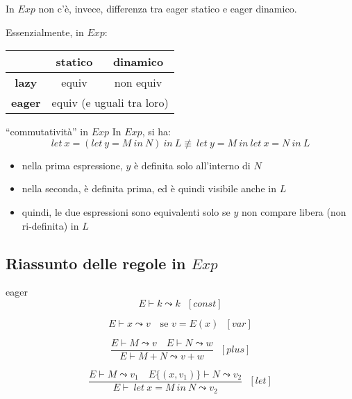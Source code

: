 \documentclass[a4paper,11pt]{report}
\begin{document}
In \( Exp \) non c'è, invece, differenza tra eager statico e eager dinamico.

\begin{gbox}{}
   Essenzialmente, in \( Exp \):
   \vspace{-1em}
\begin{center}
\begin{tabular}{c|c|c}
     & \textbf{statico} & \textbf{dinamico} \\ \hline
\textbf{lazy} & equiv & non equiv \\ \hline
\textbf{eager}& \multicolumn{2}{c}{equiv (e uguali tra loro)} \\
\end{tabular}
\end{center} 
\end{gbox}

\begin{gbox}[colframe=DeepGrey, colback=DeepGreyLight, colbacktitle=DeepGrey]{``commutatività'' in \( Exp \)}
    In \( Exp \), si ha:
    \[ let \ x = (let \ y  = M \ in \ N) \ in \ L \not\equiv \ let \ y = M \ in \ let \ x = N \ in \ L \]
\begin{itemize}
    \item nella prima espressione, \( y \) è definita solo all'interno di \( N \)
    \item nella seconda, è definita prima, ed è quindi visibile anche in \( L \)
    \item quindi, le due espressioni sono equivalenti solo se \( y \) non compare libera {\small \color{gray}(non ri-definita)} in \( L \)
\end{itemize}
\end{gbox}

\subsection{Riassunto delle regole in \( Exp \)}

\begin{gbox}[colframe=DeepGreen, colback=DeepGreenLight, colbacktitle=DeepGreen]{eager}
        \[ E \vdash k \leadsto k  \ \ \ [ const ] \] 
        \vspace{-2.5em}

    \[ E \vdash x \leadsto v  \ \ \ \text{ se }  v = E(x) \ \ \ [ var ] \]
        \vspace{-2em}

    \[
        \frac{
            E \vdash M \leadsto v \quad E \vdash N \leadsto w
        }{
            E \vdash M + N \leadsto v + w
        }
        \ \ \ [plus]
    \]



    \[
        \frac{
            E \vdash M \leadsto v_1 \quad E\{(x, v_1)\} \vdash N \leadsto v_2
        }{
            E \vdash \ let \ x = M \ in \ N \leadsto v_2
        }
        \ \ \  [let]
    \]


\end{gbox}
\end{document}
